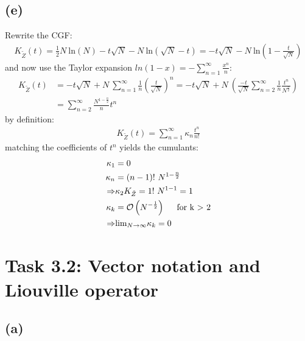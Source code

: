 \documentclass{article}
\begin{document}
\subsection*{(e)}
Rewrite the CGF:
\begin{align}
        K_{\tilde{Z}}(t)=\frac{1}{2}N\ \text{ln}(N)-t\sqrt{N}-N\ \text{ln}(\sqrt{N}-t)=-t\sqrt{N}-N\ \text{ln}\left(1-\frac{t}{\sqrt{N}}\right)
\end{align}
and now use the Taylor expansion $ln(1-x)=-\sum_{n=1}^\infty \frac{x^n}{n}$:
\begin{align}
        K_{\tilde{Z}}(t)&=-t\sqrt{N}+N\ \sum_{n=1}^\infty\frac{1}{n}\left(\frac{t}{\sqrt{N}}\right)^n= -t\sqrt{N}+N\ \left(\frac{-t}{\sqrt{N}} \sum_{n=2}^\infty\frac{1}{n}\frac{t^n}{N^{\frac{n}{2}}}\right)\\
        &=\sum_{n=2}^\infty\frac{N^{1-\frac{n}{2}}}{n}t^n
\end{align}
by definition:
\begin{align}
    K_{\tilde{Z}}(t)= \sum_{n=1}^\infty \kappa_n\frac{t^n}{n!}
\end{align}
matching the coefficients of $t^n$ yields the cumulants:
\begin{align}
    \kappa_1&=0\\
    \kappa_n&=(n-1)!\ N^{1-\frac{n}{2}}\\
    \Rightarrow& \kappa_2K_{\tilde{Z}}=1!\ N^{1-1}= 1\\
    \kappa_k&= \mathcal{O}\left(N^{-\frac{1}{2}}\right) \hspace{0.5cm}\text{for k $>$ 2}\\
    \Rightarrow &\text{lim}_{N\rightarrow\infty}\kappa_k=0
\end{align}


\section*{Task 3.2: Vector notation and Liouville operator}
\subsection*{(a)}
\end{document}
